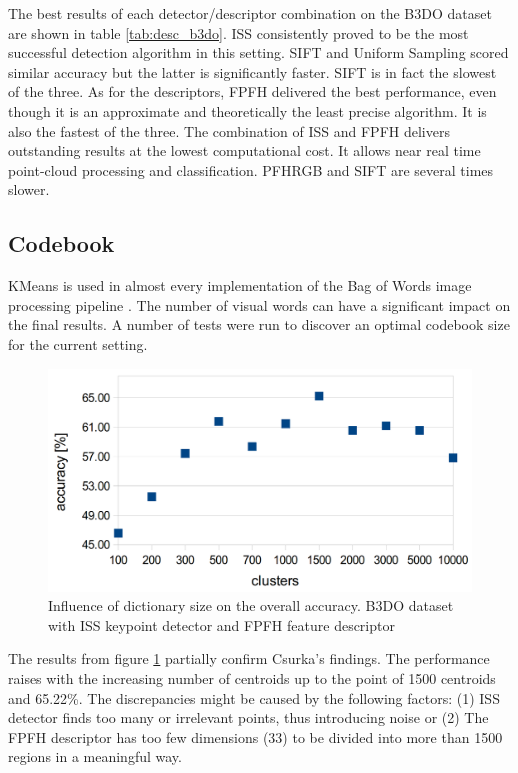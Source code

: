 \documentclass[12pt]{article}
\begin{document}
    The best results of each detector/descriptor combination on the B3DO 
dataset are shown in table \ref{tab:desc_b3do}. ISS consistently proved to be 
the most successful detection algorithm in this setting. SIFT and Uniform 
Sampling scored similar accuracy but the latter is significantly faster. SIFT 
is in fact the slowest of the three. As for the descriptors, FPFH delivered the 
best performance, even though it is an approximate and theoretically the least 
precise algorithm. It is also the fastest of the three. The combination of ISS 
and FPFH delivers outstanding results at the lowest computational cost. It 
allows near real time point-cloud processing and classification. PFHRGB and 
SIFT are several times slower.
      
  \subsection{Codebook}
    KMeans is used in almost every implementation of the Bag of Words image 
processing pipeline \cite{tsai2012bag}. The number of visual words can have a 
significant impact on the final results. A number of tests were run to discover 
an optimal codebook size for the current setting.

    \begin{figure}[!ht]
    \centering	
    \includegraphics[width=.75\textwidth]{../figs/clustering_centroids_b3do}
    \caption{Influence of dictionary size on the overall accuracy. B3DO dataset 
with ISS keypoint detector and FPFH feature descriptor}
    \label{fig:cluster_b3do}
    \end{figure}

    The results from figure \ref{fig:cluster_b3do} partially confirm Csurka's 
findings. The performance raises with the increasing number of centroids up to 
the point of 1500 centroids and 65.22\%. The discrepancies might be caused by 
the following factors: (1) ISS detector finds too many or irrelevant points, 
thus introducing noise or (2) The FPFH descriptor has too few dimensions (33) 
to be divided into more than 1500 regions in a meaningful way. 
\end{document}
